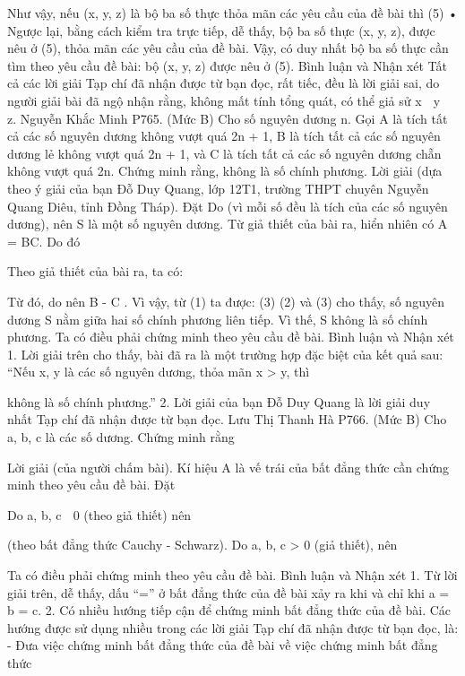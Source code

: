 \begin{multicols}{2}
	Như vậy, nếu (x, y, z) là bộ ba số thực thỏa mãn các yêu cầu của đề bài thì
	(5)
	• Ngược lại, bằng cách kiểm tra trực tiếp, dễ thấy, bộ ba số thực (x, y, z), được nêu ở (5), thỏa mãn các yêu cầu của đề bài.
	Vậy, có duy nhất bộ ba số thực cần tìm theo yêu cầu đề bài: bộ (x, y, z) được nêu ở (5).
	Bình luận và Nhận xét
	Tất cả các lời giải Tạp chí đã nhận được từ bạn đọc, rất tiếc, đều là lời giải sai, do người giải bài đã ngộ nhận rằng, không mất tính tổng quát, có thể giả sử x  y  z.
	Nguyễn Khắc Minh
	P765. (Mức B) Cho số nguyên dương n. Gọi A là tích tất cả các số nguyên dương không vượt quá 2n + 1, B là tích tất cả các số nguyên dương lẻ không vượt quá 2n + 1, và C là tích tất cả các số nguyên dương chẵn không vượt quá 2n. Chứng minh rằng,   không là số chính phương.
	Lời giải (dựa theo ý giải của bạn Đỗ Duy Quang, lớp 12T1, trường THPT chuyên Nguyễn Quang Diêu, tỉnh Đồng Tháp).
	Đặt  
	Do   (vì mỗi số đều là tích của các số nguyên dương), nên S là một số nguyên dương.
	Từ giả thiết của bài ra, hiển nhiên có A = BC.
	Do đó
	
	Theo giả thiết của bài ra, ta có:
	
	Từ đó, do   nên B - C . Vì vậy, từ (1) ta được:
	(3)
	(2) và (3) cho thấy, số nguyên dương S nằm giữa hai số chính phương liên tiếp. Vì thế, S không là số chính phương.
	Ta có điều phải chứng minh theo yêu cầu đề bài.
	Bình luận và Nhận xét
	1. Lời giải trên cho thấy, bài đã ra là một trường hợp đặc biệt của kết quả sau:
	“Nếu x, y là các số nguyên dương, thỏa mãn x > y, thì
	
	không là số chính phương.”
	2. Lời giải của bạn Đỗ Duy Quang là lời giải duy nhất Tạp chí đã nhận được từ bạn đọc.
	Lưu Thị Thanh Hà
	P766. (Mức B) Cho a, b, c là các số dương. Chứng minh rằng
	
	Lời giải (của người chấm bài).
	Kí hiệu A là vế trái của bất đẳng thức cần chứng minh theo yêu cầu đề bài.
	Đặt
	
	Do a, b, c  0 (theo giả thiết) nên
	
	(theo bất đẳng thức Cauchy - Schwarz).
	Do a, b, c > 0 (giả thiết), nên
	
	Ta có điều phải chứng minh theo yêu cầu đề bài.
	Bình luận và Nhận xét
	1. Từ lời giải trên, dễ thấy, dấu “=” ở bất đẳng thức của đề bài xảy ra khi và chỉ khi a = b = c.
	2. Có nhiều hướng tiếp cận để chứng minh bất đẳng thức của đề bài. Các hướng được sử dụng nhiều trong các lời giải Tạp chí đã nhận được từ bạn đọc, là:
	- Đưa việc chứng minh bất đẳng thức của đề bài về việc chứng minh bất đẳng thức
	

\end{multicols}
